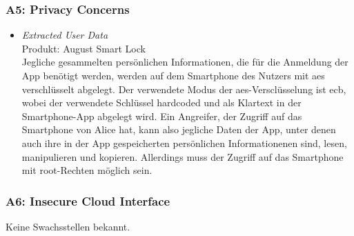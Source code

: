     \subsubsection*{A5: Privacy Concerns}
        \begin{itemize}[leftmargin=0cm,label={}]
            \item \emph{Extracted User Data}\cite{Lariviere2015,Ye2017}\label{vuln:userdata}\\
                Produkt: August Smart Lock\\ 
                Jegliche gesammelten persönlichen Informationen, die für die Anmeldung der App benötigt werden, werden auf dem Smartphone des Nutzers mit \gls{aes} verschlüsselt abgelegt. 
                Der verwendete Modus der \gls{aes}-Versclüsselung ist \gls{ecb}, wobei der verwendete Schlüssel hardcoded und als Klartext in der Smartphone-App abgelegt wird. 
    		    Ein Angreifer, der Zugriff auf das Smartphone von Alice hat, kann also jegliche Daten der App, unter denen auch ihre in der App gespeicherten persönlichen Informationenen sind, lesen, manipulieren und kopieren. 
    		    Allerdings muss der Zugriff auf das Smartphone mit root-Rechten möglich sein.
        \end{itemize}
        
    \subsubsection*{A6: Insecure Cloud Interface}
        Keine Swachsstellen bekannt.
        

